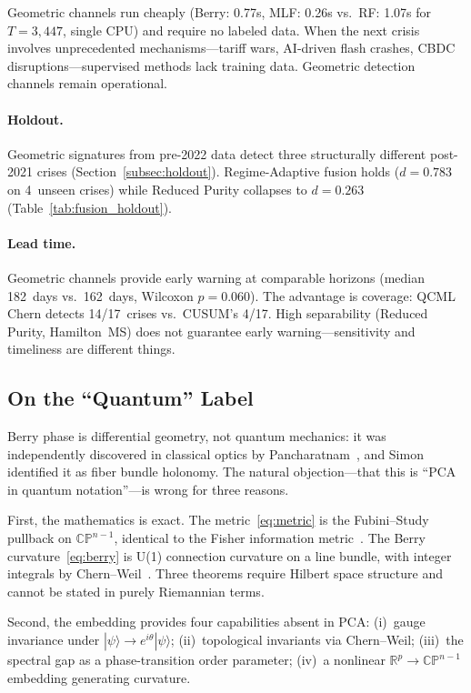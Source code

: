 \documentclass[3p]{elsarticle}
\newcommand{\ket}[1]{|#1\rangle}
\newcommand{\R}{\mathbb{R}}
\newcommand{\CP}{\mathbb{CP}}
\begin{document}
Geometric channels run cheaply (Berry: 0.77s, MLF: 0.26s vs.\ RF:
1.07s for $T = 3{,}447$, single CPU) and require no labeled data.
When the next crisis involves unprecedented mechanisms---tariff wars,
AI-driven flash crashes, CBDC disruptions---supervised methods lack
training data.  Geometric detection channels remain operational.

\paragraph{Holdout.}
Geometric signatures from pre-2022 data detect three structurally
different post-2021 crises (Section~\ref{subsec:holdout}).
Regime-Adaptive fusion holds ($d = 0.783$ on 4~unseen crises) while
Reduced Purity collapses to $d = 0.263$
(Table~\ref{tab:fusion_holdout}).

\paragraph{Lead time.}
Geometric channels provide early warning at comparable horizons
(median 182~days vs.\ 162~days, Wilcoxon $p = 0.060$).  The advantage
is coverage: QCML Chern detects 14/17~crises vs.\ CUSUM's 4/17.
High separability (Reduced Purity, Hamilton~MS) does not guarantee
early warning---sensitivity and timeliness are different things.

\subsection{On the ``Quantum'' Label}

Berry phase is differential geometry, not quantum mechanics: it was
independently discovered in classical optics by
Pancharatnam~\cite{pancharatnam1956}, and Simon~\cite{simon1983}
identified it as fiber bundle holonomy.  The natural objection---that
this is ``PCA in quantum notation''---is wrong for three reasons.

First, the mathematics is exact.  The metric~\eqref{eq:metric}
is the Fubini--Study pullback on $\CP^{n-1}$, identical to the
Fisher information metric~\cite{provost_vallee1980}.  The Berry
curvature~\eqref{eq:berry} is U(1) connection curvature on a line
bundle, with integer integrals by Chern--Weil~\cite{chern1946,nakahara2003}.
Three theorems require Hilbert space structure and cannot be stated in
purely Riemannian terms.

Second, the embedding provides four capabilities absent in PCA:
(i)~gauge invariance under $\ket{\psi} \to e^{i\theta}\ket{\psi}$;
(ii)~topological invariants via Chern--Weil;
(iii)~the spectral gap as a phase-transition order parameter;
(iv)~a nonlinear $\R^p \to \CP^{n-1}$ embedding generating curvature.
\end{document}
